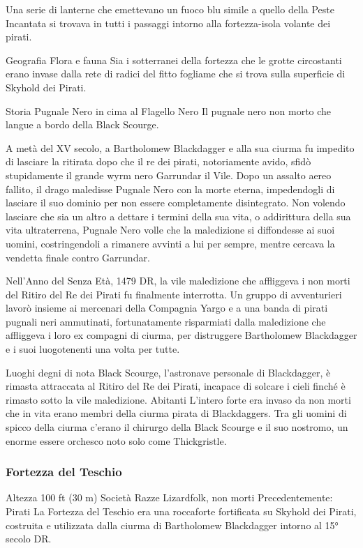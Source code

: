 \documentclass{article}
\begin{document}
Una serie di lanterne che emettevano un fuoco blu simile a quello della Peste Incantata si trovava in tutti i passaggi intorno alla fortezza-isola volante dei pirati.

Geografia
Flora e fauna
Sia i sotterranei della fortezza che le grotte circostanti erano invase dalla rete di radici del fitto fogliame che si trova sulla superficie di Skyhold dei Pirati.

Storia
Pugnale Nero in cima al Flagello Nero
Il pugnale nero non morto che langue a bordo della Black Scourge.

A metà del XV secolo, a Bartholomew Blackdagger e alla sua ciurma fu impedito di lasciare la ritirata dopo che il re dei pirati, notoriamente avido, sfidò stupidamente il grande wyrm nero Garrundar il Vile. Dopo un assalto aereo fallito, il drago maledisse Pugnale Nero con la morte eterna, impedendogli di lasciare il suo dominio per non essere completamente disintegrato. Non volendo lasciare che sia un altro a dettare i termini della sua vita, o addirittura della sua vita ultraterrena, Pugnale Nero volle che la maledizione si diffondesse ai suoi uomini, costringendoli a rimanere avvinti a lui per sempre, mentre cercava la vendetta finale contro Garrundar.

Nell'Anno del Senza Età, 1479 DR, la vile maledizione che affliggeva i non morti del Ritiro del Re dei Pirati fu finalmente interrotta. Un gruppo di avventurieri lavorò insieme ai mercenari della Compagnia Yargo e a una banda di pirati pugnali neri ammutinati, fortunatamente risparmiati dalla maledizione che affliggeva i loro ex compagni di ciurma, per distruggere Bartholomew Blackdagger e i suoi luogotenenti una volta per tutte.

Luoghi degni di nota
Black Scourge, l'astronave personale di Blackdagger, è rimasta attraccata al Ritiro del Re dei Pirati, incapace di solcare i cieli finché è rimasto sotto la vile maledizione.
Abitanti
L'intero forte era invaso da non morti che in vita erano membri della ciurma pirata di Blackdaggers. Tra gli uomini di spicco della ciurma c'erano il chirurgo della Black Scourge e il suo nostromo, un enorme essere orchesco noto solo come Thickgristle.
\subsubsection{ Fortezza del Teschio}
Altezza
100 ft (30 m)
Società
Razze
Lizardfolk, non morti
Precedentemente: Pirati
La Fortezza del Teschio era una roccaforte fortificata su Skyhold dei Pirati, costruita e utilizzata dalla ciurma di Bartholomew Blackdagger intorno al 15° secolo DR.
\end{document}
